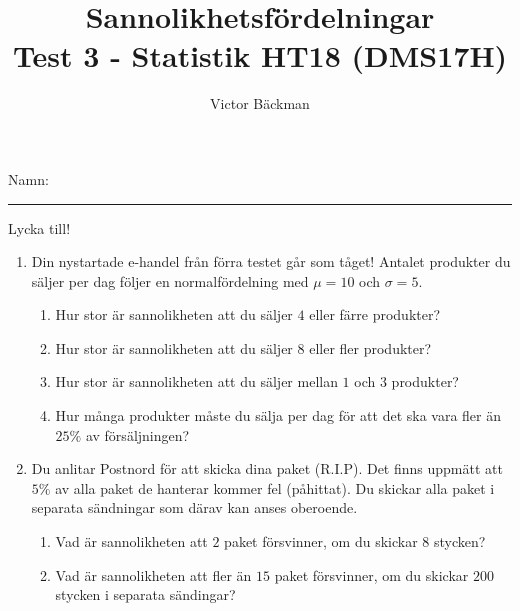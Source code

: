 \documentclass[a4paper,10pt]{article}
\title{Sannolikhetsfördelningar \\ {\large Test 3 - Statistik HT18 (DMS17H)}}
\author{Victor Bäckman}
\begin{document}
\maketitle
\vspace{2cm}
Namn:
{\rule{13cm}{0.4pt}}
\vspace{8cm}
\begin{center}
  {\huge Lycka till!}
\end{center}
\newpage
\begin{enumerate}
  \item{Din nystartade e-handel från förra testet går som tåget! Antalet produkter du säljer per dag följer en normalfördelning med $\mu = 10$ och $\sigma=5$.}
    \begin{enumerate}
      \item{Hur stor är sannolikheten att du säljer $4$ eller färre produkter?}
      \vspace{8cm}
      \item{Hur stor är sannolikheten att du säljer $8$ eller fler produkter?}
      \newpage
      \item{Hur stor är sannolikheten att du säljer mellan $1$ och $3$ produkter?}
      \vspace{6cm}
      \item{Hur många produkter måste du sälja per dag för att det ska vara fler än $25\%$ av försäljningen?}
    \end{enumerate}
    \newpage
  \item{Du anlitar Postnord för att skicka dina paket (R.I.P). Det finns uppmätt att $5\%$ av alla paket de hanterar kommer fel (påhittat). Du skickar alla paket i separata sändningar som därav kan anses oberoende.}
    \begin{enumerate}
        \item{Vad är sannolikheten att $2$ paket försvinner, om du skickar $8$ stycken?}
        \vspace{8cm}
        \item{Vad är sannolikheten att fler än $15$ paket försvinner, om du skickar $200$ stycken i separata sändingar?}
    \end{enumerate}
\end{enumerate}
\vfill
\end{document}
